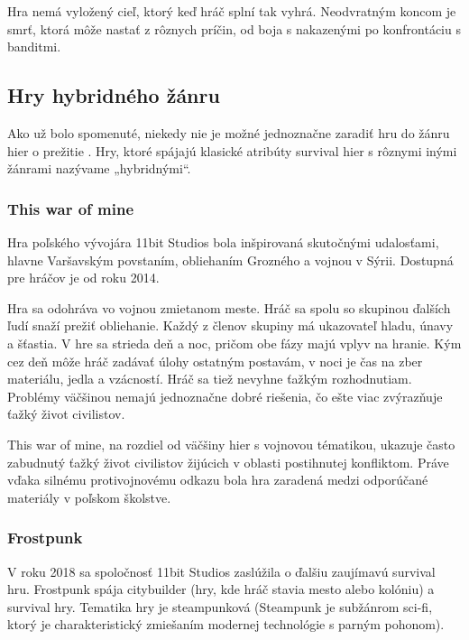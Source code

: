 \documentclass[10pt,oneoside,slovak,a4paper]{article}
\begin{document}
Hra nemá vyložený cieľ, ktorý keď hráč splní tak vyhrá. Neodvratným koncom je smrť, ktorá môže nastať z rôznych príčin, od boja s nakazenými po konfrontáciu s banditmi.\cite{Mosel}

\subsection{Hry hybridného žánru}

Ako už bolo spomenuté, niekedy nie je možné  jednoznačne zaradiť hru do žánru hier o prežitie . Hry, ktoré spájajú klasické atribúty survival hier s rôznymi inými žánrami nazývame „hybridnými“. 

\subsubsection{This war of mine}

Hra poľského vývojára 11bit Studios bola inšpirovaná skutočnými udalosťami, hlavne Varšavským povstaním, obliehaním Grozného a vojnou v Sýrii. Dostupná pre hráčov je od roku 2014.\cite{PL}

Hra sa odohráva vo  vojnou zmietanom meste. Hráč sa spolu so skupinou ďalších ľudí snaží prežiť obliehanie. Každý z členov skupiny má ukazovateľ hladu, únavy a šťastia. V hre sa strieda deň a noc, pričom obe fázy majú vplyv na hranie. Kým cez deň môže hráč zadávať úlohy ostatným  postavám, v noci je čas na zber materiálu, jedla a vzácností.
Hráč sa tiež nevyhne ťažkým rozhodnutiam. Problémy väčšinou nemajú jednoznačne dobré riešenia, čo ešte viac zvýrazňuje ťažký život civilistov.\cite{Pergerson}

This war of mine, na rozdiel od väčšiny hier s vojnovou tématikou, ukazuje často zabudnutý ťažký život civilistov žijúcich v oblasti postihnutej konfliktom. Práve vďaka silnému protivojnovému odkazu bola hra zaradená  medzi odporúčané materiály v poľskom školstve. \cite{PL}

\subsubsection{Frostpunk}

V roku 2018 sa spoločnosť 11bit Studios zaslúžila o ďalšiu zaujímavú survival hru. Frostpunk spája citybuilder (hry, kde hráč stavia mesto alebo kolóniu) a survival hry. Tematika hry je steampunková (Steampunk je subžánrom sci-fi, ktorý je charakteristický zmiešaním modernej technológie s parným pohonom).\cite{Salo}
\end{document}
